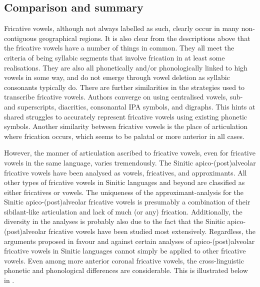 \documentclass[output=paper,colorlinks,citecolor=brown,chinesefont]{langscibook}
\begin{document}
\subsection{Comparison and summary}
Fricative vowels, although not always labelled as such, clearly occur in many non-contiguous geographical regions. It is also clear from the descriptions above that the fricative vowels have a number of things in common. They all meet the criteria of being syllabic segments that involve frication in at least some realisations. They are also all phonetically and/or phonologically linked to high vowels in some way, and do not emerge through vowel deletion as syllabic consonants typically do. There are further similarities in the strategies used to transcribe fricative vowels. Authors converge on using centralised vowels, sub- and superscripts, diacritics, consonantal IPA symbols, and digraphs. This hints at shared struggles to accurately represent fricative vowels using existing phonetic symbols. Another similarity between fricative vowels is the place of articulation where frication occurs, which seems to be palatal or more anterior in all cases.

However, the manner of articulation ascribed to fricative vowels, even for fricative vowels in the same language, varies tremendously. The Sinitic apico-(post)alveolar fricative vowels have been analysed as vowels, fricatives, and approximants. All other types of fricative vowels in Sinitic languages and beyond are classified as either fricatives or vowels. The uniqueness of the approximant-analysis for the Sinitic apico-(post)alveolar fricative vowels is presumably a combination of their sibilant-like articulation and lack of much (or any) frication. Additionally, the diversity in the analyses is probably also due to the fact that the Sinitic apico-(post)alveolar fricative vowels have been studied most extensively. Regardless, the arguments proposed in favour and against certain analyses of apico-(post)alveolar fricative vowels in Sinitic languages cannot simply be applied to other fricative vowels. Even among more anterior coronal fricative vowels, the cross-linguistic phonetic and phonological differences are considerable. This is illustrated below in .

\begin{table}
\caption{Comparison of three languages with (post)alveolar fricative vowels}
\label{tab:properties}
\end{table}
\end{document}
